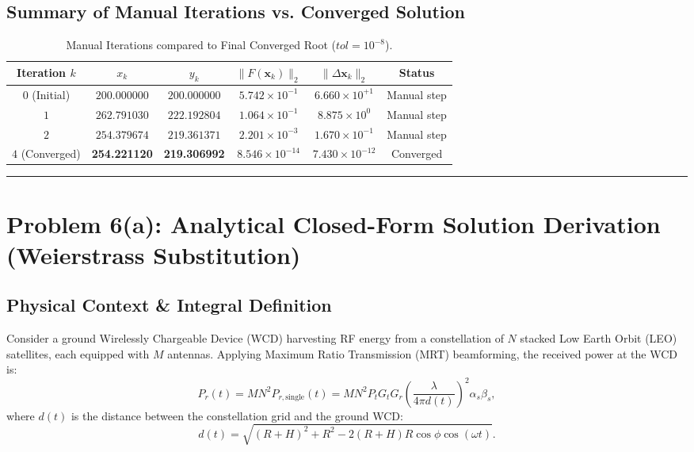 \documentclass[11pt,a4paper]{article}
\begin{document}
\subsection{Summary of Manual Iterations vs. Converged Solution}
\begin{table}[h]
\centering
\caption{Manual Iterations compared to Final Converged Root ($tol = 10^{-8}$).}
\label{tab:p1_summary}
\begin{tabular}{cccccc}
\toprule
\textbf{Iteration $k$} & $x_k$ & $y_k$ & $\|F(\mathbf{x}_k)\|_2$ & $\|\Delta \mathbf{x}_k\|_2$ & Status \\
\midrule
$0$ (Initial) & $200.000000$ & $200.000000$ & $5.742 \times 10^{-1}$ & $6.660 \times 10^{+1}$ & Manual step \\
$1$           & $262.791030$ & $222.192804$ & $1.064 \times 10^{-1}$ & $8.875 \times 10^{0}$  & Manual step \\
$2$           & $254.379674$ & $219.361371$ & $2.201 \times 10^{-3}$ & $1.670 \times 10^{-1}$ & Manual step \\
\midrule
$4$ (Converged) & \textbf{254.221120} & \textbf{219.306992} & \textbf{$8.546 \times 10^{-14}$} & \textbf{$7.430 \times 10^{-12}$} & Converged \\
\bottomrule
\end{tabular}
\end{table}

\vspace{1.5em}
\hrule
\vspace{1.5em}

\section{Problem 6(a): Analytical Closed-Form Solution Derivation (Weierstrass Substitution)}

\subsection{Physical Context \& Integral Definition}
Consider a ground Wirelessly Chargeable Device (WCD) harvesting RF energy from a constellation of $N$ stacked Low Earth Orbit (LEO) satellites, each equipped with $M$ antennas. 
Applying Maximum Ratio Transmission (MRT) beamforming, the received power at the WCD is:
\begin{equation}
    P_r(t) = M N^2 P_{r,\text{single}}(t) = M N^2 P_t G_t G_r \left( \frac{\lambda}{4\pi d(t)} \right)^2 \alpha_s \beta_s,
\end{equation}
where $d(t)$ is the distance between the constellation grid and the ground WCD:
\begin{equation}
    d(t) = \sqrt{(R + H)^2 + R^2 - 2(R + H)R \cos\phi \cos(\omega t)}.
\end{equation}
\end{document}
